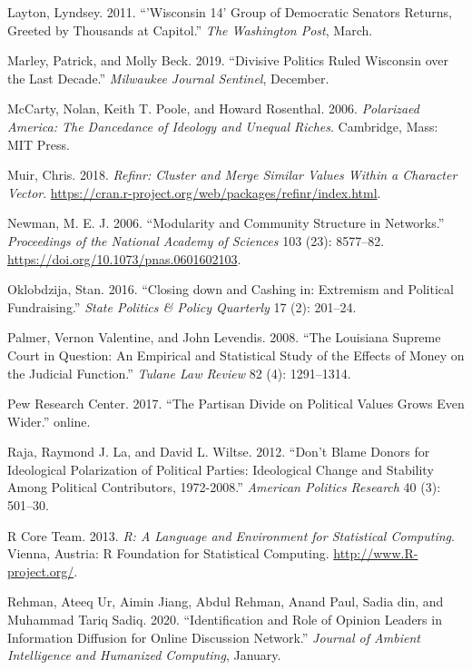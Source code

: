 \documentclass[12pt,]{article}
\begin{document}
\leavevmode\hypertarget{ref-layton2011}{}%
Layton, Lyndsey. 2011. ``'Wisconsin 14' Group of Democratic Senators
Returns, Greeted by Thousands at Capitol.'' \emph{The Washington Post},
March.

\leavevmode\hypertarget{ref-marley2019}{}%
Marley, Patrick, and Molly Beck. 2019. ``Divisive Politics Ruled
Wisconsin over the Last Decade.'' \emph{Milwaukee Journal Sentinel},
December.

\leavevmode\hypertarget{ref-mccarty2006}{}%
McCarty, Nolan, Keith T. Poole, and Howard Rosenthal. 2006.
\emph{Polarizaed America: The Dancedance of Ideology and Unequal
Riches}. Cambridge, Mass: MIT Press.

\leavevmode\hypertarget{ref-refinr}{}%
Muir, Chris. 2018. \emph{Refinr: Cluster and Merge Similar Values Within
a Character Vector}.
\url{https://cran.r-project.org/web/packages/refinr/index.html}.

\leavevmode\hypertarget{ref-newman2006}{}%
Newman, M. E. J. 2006. ``Modularity and Community Structure in
Networks.'' \emph{Proceedings of the National Academy of Sciences} 103
(23): 8577--82. \url{https://doi.org/10.1073/pnas.0601602103}.

\leavevmode\hypertarget{ref-oklobzija}{}%
Oklobdzija, Stan. 2016. ``Closing down and Cashing in: Extremism and
Political Fundraising.'' \emph{State Politics \& Policy Quarterly} 17
(2): 201--24.

\leavevmode\hypertarget{ref-palmer2008}{}%
Palmer, Vernon Valentine, and John Levendis. 2008. ``The Louisiana
Supreme Court in Question: An Empirical and Statistical Study of the
Effects of Money on the Judicial Function.'' \emph{Tulane Law Review} 82
(4): 1291--1314.

\leavevmode\hypertarget{ref-pew2017}{}%
Pew Research Center. 2017. ``The Partisan Divide on Political Values
Grows Even Wider.'' online.

\leavevmode\hypertarget{ref-laraja2011}{}%
Raja, Raymond J. La, and David L. Wiltse. 2012. ``Don't Blame Donors for
Ideological Polarization of Political Parties: Ideological Change and
Stability Among Political Contributors, 1972-2008.'' \emph{American
Politics Research} 40 (3): 501--30.

\leavevmode\hypertarget{ref-r}{}%
R Core Team. 2013. \emph{R: A Language and Environment for Statistical
Computing}. Vienna, Austria: R Foundation for Statistical Computing.
\url{http://www.R-project.org/}.

\leavevmode\hypertarget{ref-rehman2020}{}%
Rehman, Ateeq Ur, Aimin Jiang, Abdul Rehman, Anand Paul, Sadia din, and
Muhammad Tariq Sadiq. 2020. ``Identification and Role of Opinion Leaders
in Information Diffusion for Online Discussion Network.'' \emph{Journal
of Ambient Intelligence and Humanized Computing}, January.
\end{document}
